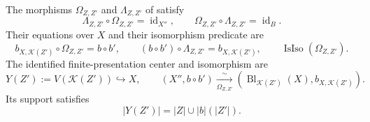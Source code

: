 \begin{theorem}
  \label{thm:nagata-composition-of-blowups}
  \lean{}

  The morphisms $\Omega_{Z,Z'}$ and $\Lambda_{Z,Z'}$ of
   satisfy
  \[
    \Lambda_{Z,Z'}\circ\Omega_{Z,Z'}=\operatorname{id}_{X''},
    \qquad
    \Omega_{Z,Z'}\circ\Lambda_{Z,Z'}=\operatorname{id}_{B}.
  \]
  Their equations over $X$ and their isomorphism predicate are
  \[
    b_{X,\mathcal K(Z')}\circ\Omega_{Z,Z'}=b\circ b',
    \qquad
    (b\circ b')\circ\Lambda_{Z,Z'}=b_{X,\mathcal K(Z')},
    \qquad
    \operatorname{IsIso}(\Omega_{Z,Z'}).
  \]
  The identified finite-presentation center and isomorphism are
  \[
    Y(Z'):=V(\mathcal K(Z'))\hookrightarrow X,
    \qquad
    (X'',b\circ b')\xrightarrow[\Omega_{Z,Z'}]{\sim}
      (\operatorname{Bl}_{\mathcal K(Z')}(X),b_{X,\mathcal K(Z')}).
  \]
  Its support satisfies
  \[
    |Y(Z')|=|Z|\cup |b|(|Z'|).
  \]
\end{theorem}

